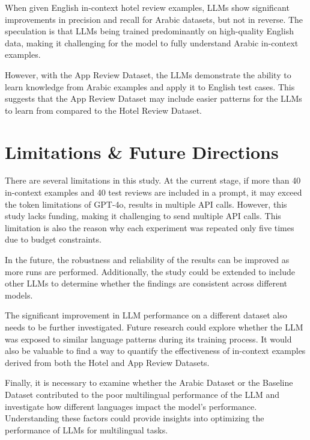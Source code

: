 \documentclass[sigconf, nonacm]{acmart}
\theoremstyle{definition}
\begin{document}
When given English in-context hotel review examples, LLMs show significant improvements in precision and recall for Arabic datasets, but not in reverse. The speculation is that LLMs being trained predominantly on high-quality English data, making it challenging for the model to fully understand Arabic in-context examples.

However, with the App Review Dataset, the LLMs demonstrate the ability to learn knowledge from Arabic examples and apply it to English test cases. This suggests that the App Review Dataset may include easier patterns for the LLMs to learn from compared to the Hotel Review Dataset.

\section{Limitations \& Future Directions}
There are several limitations in this study. At the current stage, if more than 40 in-context examples and 40 test reviews are included in a prompt, it may exceed the token limitations of GPT-4o, results in multiple API calls. However, this study lacks funding, making it challenging to send multiple API calls. This limitation is also the reason why each experiment was repeated only five times due to budget constraints.

In the future, the robustness and reliability of the results can be improved as more runs are performed. Additionally, the study could be extended to include other LLMs to determine whether the findings are consistent across different models.

The significant improvement in LLM performance on a different dataset also needs to be further investigated. Future research could explore whether the LLM was exposed to similar language patterns during its training process. It would also be valuable to find a way to quantify the effectiveness of in-context examples derived from both the Hotel and App Review Datasets.

Finally, it is necessary to examine whether the Arabic Dataset or the Baseline Dataset contributed to the poor multilingual performance of the LLM and investigate how different languages impact the model's performance. Understanding these factors could provide insights into optimizing the performance of LLMs for multilingual tasks.



\end{document}
